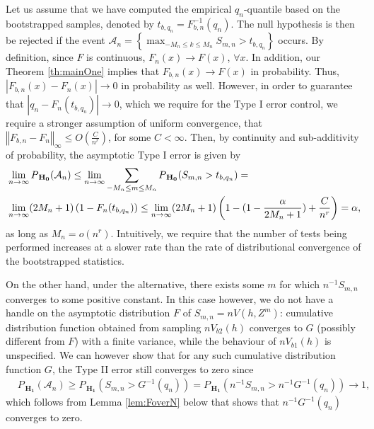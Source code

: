 Let us assume that we have computed the empirical $q_{n}$-quantile based on the bootstrapped samples, denoted by $t_{b,q_{n}}=F_{b,n}^{-1}(q_n)$. The null hypothesis is then be rejected if the event $\mathcal A_{n} = \left\{ \max_{-M_n \leq k \leq M_n} S_{m,n} > t_{b,q_{n}} \right\}$ occurs. By definition, since $F$ is continuous, $F_n(x)\to F(x)$, $\forall x$. In addition, our Theorem \ref{th:mainOne} implies that $F_{b,n}(x)\to F(x)$ in probability. Thus, $|F_{b,n}(x)-F_n(x)|\to 0$ in probability as well. However, in order to guarantee that $|q_n-F_n(t_{b,q_{n}})|\to 0$, which we require for the Type I error control, we require a stronger assumption of uniform convergence, that $\left\Vert F_{b,n}-F_n\right\Vert_{\infty}\leq O(\frac{C}{n^r})$, for some $C<\infty$. Then, by continuity and sub-additivity of probability, the asymptotic Type I error is given by 
\begin{align}
\label{eq:type1}
&\lim_{n \to \infty} P_{\,\mathbf{H_0}}( \mathcal A_{n}) \leq \lim_{n \to \infty}  \sum_{-M_n \leq m \leq M_n} P_{\,\mathbf{H_0}}(S_{m,n} >t_{b,q_{n}}) = \notag\\  
&\lim_{n \to \infty} (2M_n+1) \left(1-F_n(t_{b,q_{n}})\right) \leq \lim_{n \to \infty} (2M_n+1) \left( 1 - (1-\frac{\alpha}{2M_n+1}) + \frac C {n^r}\right)= \alpha, 
\end{align}
as long as $M_n=o(n^r)$. Intuitively, we require that the number of tests being performed increases at a slower rate than the rate of distributional convergence of the bootstrapped statistics.%
 
On the other hand, under the alternative, there exists some $m$ for which $n^{-1} S_{m,n}$ converges to some positive constant. In this case however, we do not have a handle on the asymptotic distribution $F$ of $S_{m,n} = n V(h,Z^m)$: cumulative distribution function obtained from sampling $n V_{b2}(h)$ converges to $G$ (possibly different from $F$) with a finite variance, while the behaviour of $n V_{b1}(h)$ is unspecified. We can however show that for any such cumulative distribution function $G$, the Type II error still converges to zero since
\begin{align*}
&P_{\,\mathbf{H_1}}(\mathcal A_{n}) \geq P_{\,\mathbf{H_1}}( S_{m,n} > G^{-1}(q_{n}) ) = P_{\,\mathbf{H_1}}( n^{-1} S_{m,n} > n^{-1} G^{-1}(q_{n}) ) \to 1,
\end{align*}
which follows from Lemma  \ref{lem:FoverN} below that shows that $n^{-1} G^{-1}(q_{n})$ converges to zero. 

